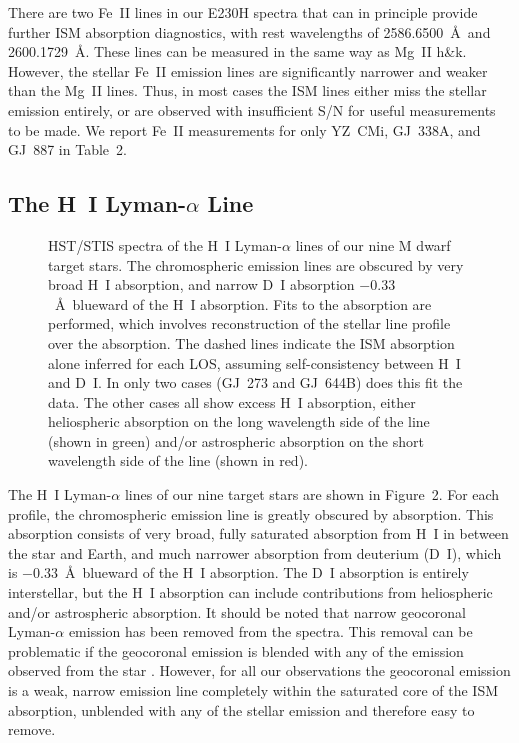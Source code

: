 \documentclass[preprint]{aastex}
\begin{document}
     There are two Fe~II lines in our E230H spectra that can in principle
provide further ISM absorption diagnostics, with rest wavelengths of
2586.6500~\AA\ and 2600.1729~\AA.  These lines can be measured in the
same way as Mg~II h\&k.  However, the stellar Fe~II emission lines
are significantly narrower and weaker than the Mg~II lines.  Thus, in most
cases the ISM lines either miss the stellar emission entirely, or are observed
with insufficient S/N for useful measurements to be made.  We report Fe~II
measurements for only YZ~CMi, GJ~338A, and GJ~887 in Table~2.

\subsection{The H~I Lyman-$\alpha$ Line}

\begin{figure}[t]
\caption{HST/STIS spectra of the H~I Lyman-$\alpha$ lines of
  our nine M dwarf target stars.  The chromospheric emission
  lines are obscured by very broad H~I absorption, and narrow
  D~I absorption $-0.33$~\AA\ blueward of the H~I absorption.
  Fits to the absorption are performed, which involves
  reconstruction of the stellar line profile over the
  absorption.  The dashed lines indicate the ISM absorption
  alone inferred for each LOS, assuming self-consistency
  between H~I and D~I.  In only two cases (GJ~273 and
  GJ~644B) does this fit the data.  The other cases all show
  excess H~I absorption, either heliospheric absorption on the
  long wavelength side of the line (shown in green) and/or astrospheric
  absorption on the short wavelength side of the line (shown in red).}
\end{figure}
     The H~I Lyman-$\alpha$ lines of our nine target stars are
shown in Figure~2.  For each profile, the chromospheric emission
line is greatly obscured by absorption.  This absorption consists
of very broad, fully saturated absorption from H~I in between
the star and Earth, and much narrower absorption from deuterium
(D~I), which is $-0.33$~\AA\ blueward of the H~I absorption.  The D~I
absorption is entirely interstellar, but the H~I absorption can
include contributions from heliospheric and/or astrospheric
absorption.  It should be noted that narrow geocoronal
Lyman-$\alpha$ emission has been removed from the spectra.  This
removal can be problematic if the geocoronal emission is blended with
any of the emission observed from the star \citep{bew05b}.
However, for all our observations the geocoronal emission is a
weak, narrow emission line completely within the saturated core
of the ISM absorption, unblended with any of the stellar emission and
therefore easy to remove.
\end{document}
